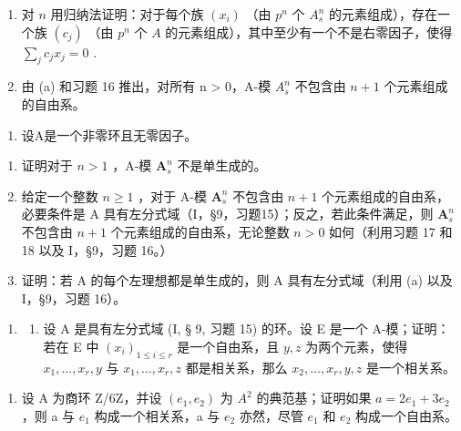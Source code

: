 \begin{enumerate}
\def\labelenumi{(\alph{enumi})}
\item
  对 \(n\) 用归纳法证明：对于每个族 \((x_{i})\) （由 \(p^n\) 个 \(A_s^n\) 的元素组成），存在一个族 \((c_j)\) （由 \(p^n\) 个 \(A\) 的元素组成），其中至少有一个不是右零因子，使得 \(\sum_{j} c_j x_j = 0\) .
\item
  由 (a) 和习题 16 推出，对所有 n \textgreater{} 0，A-模 \(A_{s}^{n}\) 不包含由 \(n + 1\) 个元素组成的自由系。
\end{enumerate}

\begin{enumerate}
\def\labelenumi{\arabic{enumi}.}
\setcounter{enumi}{18}
\tightlist
\item
  设A是一个非零环且无零因子。
\end{enumerate}

\begin{enumerate}
\def\labelenumi{(\alph{enumi})}
\item
  证明对于 \(n > 1\) ，A-模 \(\mathbf{A}_s^n\) 不是单生成的。
\item
  给定一个整数 \(n \geqslant 1\) ，对于 A-模 \(\mathbf{A}_s^n\) 不包含由 \(n + 1\) 个元素组成的自由系，必要条件是 A 具有左分式域（I，§9，习题15）；反之，若此条件满足，则 \(\mathbf{A}_s^n\) 不包含由 \(n + 1\) 个元素组成的自由系，无论整数 \(n > 0\) 如何（利用习题 17 和 18 以及 I，§9，习题 16。）
\item
  证明：若 A 的每个左理想都是单生成的，则 A 具有左分式域（利用 (a) 以及 I，§9，习题 16）。
\end{enumerate}

\begin{enumerate}
\def\labelenumi{\arabic{enumi}.}
\setcounter{enumi}{19}
\tightlist
\item
  \begin{enumerate}
  \def\labelenumii{(\alph{enumii})}
  \tightlist
  \item
    设 A 是具有左分式域 (I, § 9, 习题 15) 的环。设 E 是一个 A-模；证明：若在 E 中 \((x_{i})_{1\leqslant i\leqslant r}\) 是一个自由系，且 \(y,z\) 为两个元素，使得 \(x_{1},\ldots ,x_{r},y\) 与 \(x_{1},\ldots ,x_{r},z\) 都是相关系，那么 \(x_{2},\ldots ,x_{r},y,z\) 是一个相关系。
  \end{enumerate}
\end{enumerate}

\begin{enumerate}
\def\labelenumi{(\alph{enumi})}
\setcounter{enumi}{1}
\tightlist
\item
  设 A 为商环 Z/6Z，并设 \((e_{1}, e_{2})\) 为 \(A^{2}\) 的典范基；证明如果 \(a = 2e_{1} + 3e_{2}\) ，则 a 与 \(e_{1}\) 构成一个相关系，a 与 \(e_{2}\) 亦然，尽管 \(e_{1}\) 和 \(e_{2}\) 构成一个自由系。
\end{enumerate}

